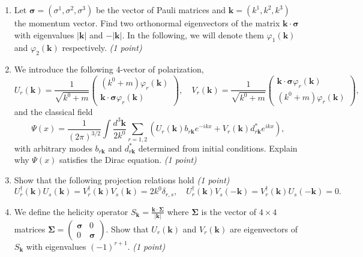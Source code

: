 \begin{enumerate}
    \item Let $\boldsymbol{\sigma} = (\sigma^1, \sigma^2, \sigma^3)$ be the vector of Pauli matrices and $\mathbf{k} = (k^1, k^2, k^3)$ the momentum vector. Find two orthonormal eigenvectors of the matrix $\mathbf{k}\cdot\boldsymbol{\sigma}$ with eigenvalues $|\mathbf{k}|$ and $-|\mathbf{k}|$. In the following, we will denote them $\varphi_1(\mathbf{k})$ and $\varphi_2(\mathbf{k})$ respectively. \textit{(1 point)}

    \item We introduce the following 4-vector of polarization,
    \begin{equation}
        U_r(\mathbf{k}) = \frac{1}{\sqrt{k^0+m}} \begin{pmatrix} (k^0+m)\varphi_r(\mathbf{k}) \\ \mathbf{k}\cdot\boldsymbol{\sigma}\varphi_r(\mathbf{k}) \end{pmatrix}, \quad V_r(\mathbf{k}) = \frac{1}{\sqrt{k^0+m}} \begin{pmatrix} \mathbf{k}\cdot\boldsymbol{\sigma}\varphi_r(\mathbf{k}) \\ (k^0+m)\varphi_r(\mathbf{k}) \end{pmatrix},
    \end{equation}
    and the classical field
    \begin{equation}
        \Psi(x) = \frac{1}{(2\pi)^{3/2}} \int \frac{d^3\mathbf{k}}{2k^0} \sum_{r=1,2} (U_r(\mathbf{k})b_{r\mathbf{k}}e^{-ikx} + V_r(\mathbf{k})d^*_{r\mathbf{k}}e^{ikx}),
    \end{equation}
    with arbitrary modes $b_{r\mathbf{k}}$ and $d^*_{r\mathbf{k}}$ determined from initial conditions. Explain why $\Psi(x)$ satisfies the Dirac equation. \textit{(1 point)}

    \item Show that the following projection relations hold \textit{(1 point)}
    \begin{equation}
        U^\dagger_r(\mathbf{k})U_s(\mathbf{k}) = V^\dagger_r(\mathbf{k})V_s(\mathbf{k}) = 2k^0\delta_{r,s}, \quad U^\dagger_r(\mathbf{k})V_s(-\mathbf{k}) = V^\dagger_r(\mathbf{k})U_s(-\mathbf{k}) = 0.
    \end{equation}

    \item We define the helicity operator $S_{\mathbf{k}} = \frac{\mathbf{k}\cdot\boldsymbol{\Sigma}}{|\mathbf{k}|}$ where $\boldsymbol{\Sigma}$ is the vector of $4\times4$ matrices $\boldsymbol{\Sigma} = \begin{pmatrix} \boldsymbol{\sigma} & 0 \\ 0 & \boldsymbol{\sigma} \end{pmatrix}$. Show that $U_r(\mathbf{k})$ and $V_r(\mathbf{k})$ are eigenvectors of $S_{\mathbf{k}}$ with eigenvalues $(-1)^{r+1}$. \textit{(1 point)}


\end{enumerate}
